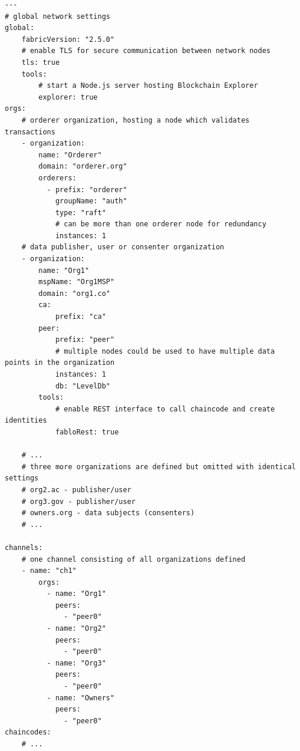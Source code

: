 \documentclass[12pt]{article}
\begin{document}
    \newpage
    \begin{lstlisting}[style=yaml,
        caption={fablo.yaml - configuration file generating the network}, label={lst:network}]
---
# global network settings
global:
    fabricVersion: "2.5.0"
    # enable TLS for secure communication between network nodes
    tls: true
    tools:
        # start a Node.js server hosting Blockchain Explorer
        explorer: true
orgs:
    # orderer organization, hosting a node which validates transactions
    - organization:
        name: "Orderer"
        domain: "orderer.org"
        orderers:
          - prefix: "orderer"
            groupName: "auth"
            type: "raft"
            # can be more than one orderer node for redundancy
            instances: 1
    # data publisher, user or consenter organization
    - organization:
        name: "Org1"
        mspName: "Org1MSP"
        domain: "org1.co"
        ca:
            prefix: "ca"
        peer:
            prefix: "peer"
            # multiple nodes could be used to have multiple data points in the organization
            instances: 1
            db: "LevelDb"
        tools:
            # enable REST interface to call chaincode and create identities
            fabloRest: true

    # ...
    # three more organizations are defined but omitted with identical settings
    # org2.ac - publisher/user
    # org3.gov - publisher/user
    # owners.org - data subjects (consenters)
    # ...
    
channels:
    # one channel consisting of all organizations defined
    - name: "ch1"
        orgs:
          - name: "Org1"
            peers:
              - "peer0"
          - name: "Org2"
            peers:
              - "peer0"
          - name: "Org3"
            peers:
              - "peer0"
          - name: "Owners"
            peers:
              - "peer0"
chaincodes:
    # ...
    \end{lstlisting}
\end{document}
